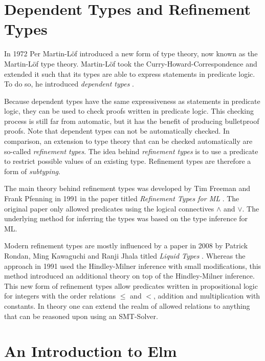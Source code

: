 \documentclass[]{scrbook}
\theoremstyle{definition}
\theoremstyle{definition}
\theoremstyle{definition}
\theoremstyle{remark}
\begin{document}
\section{Dependent Types and Refinement
Types}\label{dependent-types-and-refinement-types}

In 1972 Per Martin-Löf introduced a new form of type theory, now known
as the Martin-Löf type theory. Martin-Löf took the
Curry-Howard-Correspondence and extended it such that its types are able
to express statements in predicate logic. To do so, he introduced
\emph{dependent types} \autocite{modern_perspective_on_type_theory}.

Because dependent types have the same expressiveness as statements in
predicate logic, they can be used to check proofs written in predicate
logic. This checking process is still far from automatic, but it has the
benefit of producing bulletproof proofs. Note that dependent types can
not be automatically checked. In comparison, an extension to type theory
that can be checked automatically are so-called \emph{refinement types}.
The idea behind \emph{refinement types} is to use a predicate to
restrict possible values of an existing type. Refinement types are
therefore a form of \emph{subtyping}.

The main theory behind refinement types was developed by Tim Freeman and
Frank Pfenning in 1991 in the paper titled \emph{Refinement Types for
ML} \autocite{refinement_types_for_ML}. The original paper only allowed
predicates using the logical connectives \(\land\) and \(\lor\). The
underlying method for inferring the types was based on the type
inference for ML.

Modern refinement types are mostly influenced by a paper in 2008 by
Patrick Rondan, Ming Kawaguchi and Ranji Jhala titled \emph{Liquid
Types} \autocite{liquidTypes}. Whereas the approach in 1991 used the
Hindley-Milner inference with small modifications, this method
introduced an additional theory on top of the Hindley-Milner inference.
This new form of refinement types allow predicates written in
propositional logic for integers with the order relations \(\leq\) and
\(<\), addition and multiplication with constants. In theory one can
extend the realm of allowed relations to anything that can be reasoned
upon using an SMT-Solver.

\section{An Introduction to Elm}\label{an-introduction-to-elm}
\end{document}
